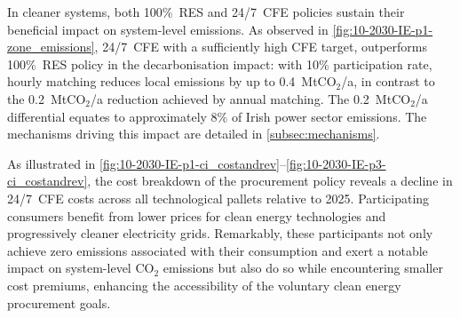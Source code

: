 In cleaner systems, both 100\%~RES and 24/7~CFE policies sustain their beneficial impact on system-level emissions. 
As observed in \cref{fig:10-2030-IE-p1-zone_emissions}, 24/7~CFE with a sufficiently high CFE target, outperforms 100\%~RES policy in the decarbonisation impact: with 10\% participation rate, hourly matching reduces local emissions by up to 0.4~Mt\(\text{CO}_2\)/a, in contrast to the 0.2~Mt\(\text{CO}_2\)/a reduction achieved by annual matching. 
The 0.2~Mt\(\text{CO}_2\)/a differential equates to approximately 8\% of Irish power sector emissions.
The mechanisms driving this impact are detailed in \cref{subsec:mechanisms}.

As illustrated in \cref{fig:10-2030-IE-p1-ci_costandrev}--\cref{fig:10-2030-IE-p3-ci_costandrev}, the cost breakdown of the procurement policy reveals a decline in 24/7~CFE costs across all technological pallets relative to 2025.
Participating consumers benefit from lower prices for clean energy technologies and progressively cleaner electricity grids. 
Remarkably, these participants not only achieve zero emissions associated with their consumption and exert a notable impact on system-level \(\text{CO}_2\) emissions but also do so while encountering smaller cost premiums, enhancing the accessibility of the voluntary clean energy procurement goals.


